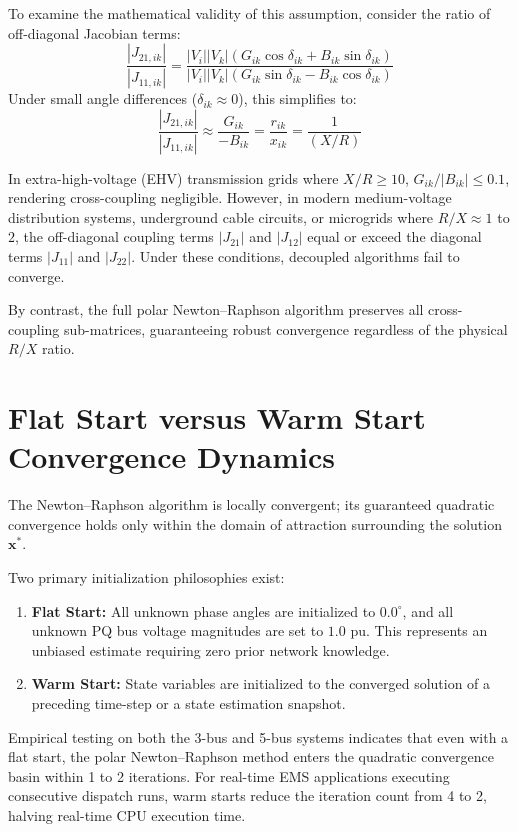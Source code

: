 \documentclass[12pt,a4paper,oneside]{report}
\begin{document}
To examine the mathematical validity of this assumption, consider the ratio of off-diagonal Jacobian terms:
\begin{equation}
\frac{|J_{21,ik}|}{|J_{11,ik}|} = \frac{|V_i| |V_k| (G_{ik}\cos\delta_{ik} + B_{ik}\sin\delta_{ik})}{|V_i| |V_k| (G_{ik}\sin\delta_{ik} - B_{ik}\cos\delta_{ik})}
\end{equation}
Under small angle differences ($\delta_{ik} \approx 0$), this simplifies to:
\begin{equation}
\frac{|J_{21,ik}|}{|J_{11,ik}|} \approx \frac{G_{ik}}{-B_{ik}} = \frac{r_{ik}}{x_{ik}} = \frac{1}{(X/R)}
\end{equation}

In extra-high-voltage (EHV) transmission grids where $X/R \ge 10$, $G_{ik}/|B_{ik}| \le 0.1$, rendering cross-coupling negligible. However, in modern medium-voltage distribution systems, underground cable circuits, or microgrids where $R/X \approx 1$ to $2$, the off-diagonal coupling terms $|J_{21}|$ and $|J_{12}|$ equal or exceed the diagonal terms $|J_{11}|$ and $|J_{22}|$. Under these conditions, decoupled algorithms fail to converge.

By contrast, the full polar Newton--Raphson algorithm preserves all cross-coupling sub-matrices, guaranteeing robust convergence regardless of the physical $R/X$ ratio.

\section{Flat Start versus Warm Start Convergence Dynamics}
The Newton--Raphson algorithm is locally convergent; its guaranteed quadratic convergence holds only within the domain of attraction surrounding the solution $\mathbf{x}^*$.

Two primary initialization philosophies exist:
\begin{enumerate}
    \item \textbf{Flat Start:} All unknown phase angles are initialized to $0.0^\circ$, and all unknown PQ bus voltage magnitudes are set to $1.0\text{ pu}$. This represents an unbiased estimate requiring zero prior network knowledge.
    \item \textbf{Warm Start:} State variables are initialized to the converged solution of a preceding time-step or a state estimation snapshot.
\end{enumerate}

Empirical testing on both the 3-bus and 5-bus systems indicates that even with a flat start, the polar Newton--Raphson method enters the quadratic convergence basin within 1 to 2 iterations. For real-time EMS applications executing consecutive dispatch runs, warm starts reduce the iteration count from 4 to 2, halving real-time CPU execution time.
\end{document}
